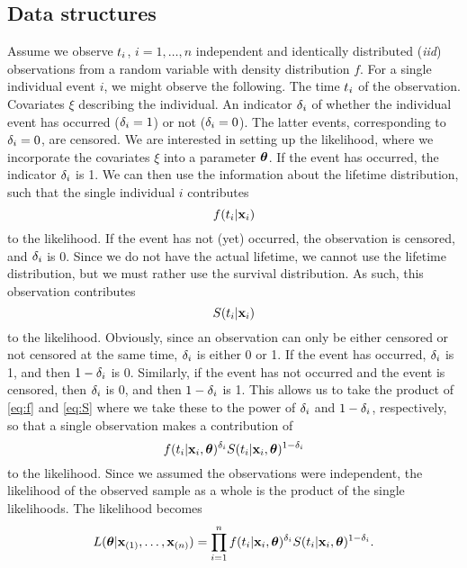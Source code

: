 \subsection{Data structures}\label{sec:surv-data}
Assume we observe $t_{i}$, $i=1,\dotsc,n$ independent and identically distributed (\textit{iid}) observations from a random variable with density distribution $f$. For a single individual event $i$, we might observe the following. The time $t_{i}$ of the observation. Covariates $\xi$ describing the individual. An indicator $\delta_{i}$ of whether the individual event has occurred ($\delta_{i} = 1$) or not ($\delta_{i} = 0$). The latter events, corresponding to $\delta_{i}=0$, are censored. We are interested in setting up the likelihood, where we incorporate the covariates $\xi$ into a parameter $\boldsymbol{\theta}$. If the event has occurred, the indicator $\delta_{i}$ is 1. We can then use the information about the lifetime distribution, such that the single individual $i$ contributes
\begin{equation}\label{eq:f}
    f(t_{i}|\mathbf{x}_{i})
\end{equation}
to the likelihood. If the event has not (yet) occurred, the observation is censored, and $\delta_{i}$ is 0. Since we do not have the actual lifetime, we cannot use the lifetime distribution, but we must rather use the survival distribution. As such, this observation contributes
\begin{equation}\label{eq:S}
    S(t_{i}|\mathbf{x}_{i})
\end{equation}
to the likelihood. Obviously, since an observation can only be either censored or not censored at the same time, $\delta_{i}$ is either 0 or 1. If the event has occurred, $\delta_{i}$ is 1, and then $1-\delta_{i}$ is 0. Similarly, if the event has not occurred and the event is censored, then $\delta_{i}$
 is 0, and then $1-\delta_{i}$ is 1. This allows us to take the product of \eqref{eq:f} and \eqref{eq:S} where we take these to the power of $\delta_{i}$ and $1-\delta_{i}$, respectively, so that a single observation makes a contribution of
\begin{equation*}
    f(t_{i}|\mathbf{x}_{i},\boldsymbol{\theta})^{\delta_{i}}S(t_{i}|\mathbf{x}_{i},\boldsymbol{\theta})^{1-\delta_{i}}
\end{equation*}
to the likelihood. Since we assumed the observations were independent, the likelihood of the observed sample as a whole is the product of the single likelihoods. The likelihood becomes
\begin{equation}\label{eq:surv-lik}
    L(\boldsymbol{\theta}|\mathbf{x}_{(1)},\ldots,\mathbf{x}_{(n)})=\prod_{i=1}^n f(t_{i}|\mathbf{x}_{i},\boldsymbol{\theta})^{\delta_{i}} S(t_{i}|\mathbf{x}_{i},\boldsymbol{\theta})^{1-\delta_{i}}.
\end{equation}
